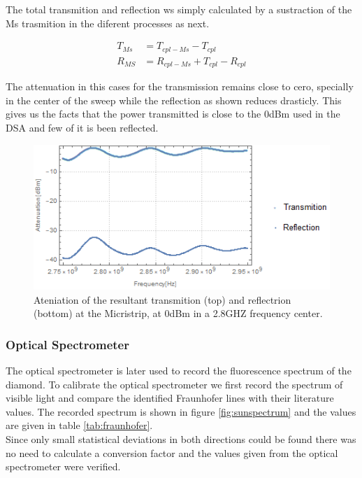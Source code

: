 The total transmition and reflection ws simply calculated by a sustraction of the Ms trasmition in the diferent processes as next.

\begin{align}
T_{Ms}&=T_{cpl-Ms}-T_{cpl}\\
R_{MS}&=R_{cpl-Ms}+T_{cpl}-R_{cpl}
\end{align}


The attenuation in this cases for the transmission remains close to cero, specially in the center of the sweep while the reflection as shown reduces drasticly. This gives  us the facts that the power transmitted is close to the 0dBm used in the DSA and few of it is been reflected.

\begin{figure}
	\centering
	\includegraphics[width=0.7\linewidth]{../figures/microstrip-trasm-eflect}
	\caption[trans-refl]{Ateniation of the resultant transmition (top) and reflectrion (bottom) at the Micristrip, at 0dBm in a 2.8GHZ frequency center.}
	\label{fig:microstrip-trasm-eflect}
\end{figure}

\subsubsection{Optical Spectrometer}
The optical spectrometer is later used to record the fluorescence spectrum of the diamond. To calibrate the optical spectrometer we first record the spectrum of visible light and compare the identified Fraunhofer lines with their literature values. The recorded spectrum is shown in figure \ref{fig:sunspectrum} and the values are given in table \ref{tab:fraunhofer}.\\

Since only small statistical deviations in both directions could be found there was no need to calculate a conversion factor and the values given from the optical spectrometer were verified. \\

